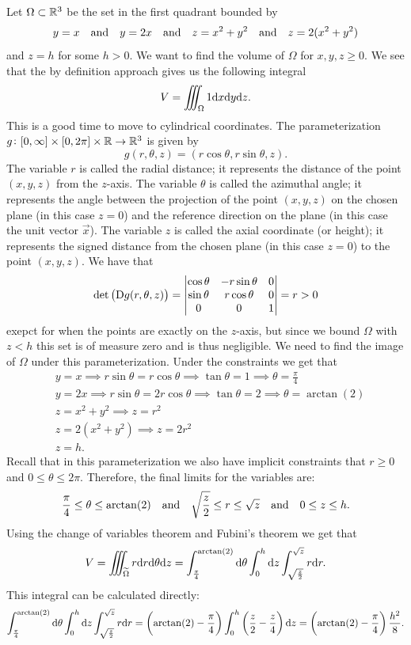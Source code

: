 \documentclass[11pt,a4paper]{article}
\begin{document}
\begin{example}
  Let $\Omega \subset \mathbb{R}^3$ be the set in the first quadrant bounded by
  \[
    y = x \quad \text{and} \quad
    y = 2x \quad \text{and} \quad
    z = x^2 + y^2 \quad \text{and} \quad
    z = 2 (x^2 + y^2)
  \]
  and $z = h$ for some $h > 0$.
  We want to find the volume of $\Omega$ for $x,y,z \geq 0$.
  We see that the by definition approach gives us the following integral
  \[
    V = \iiint_{\Omega} 1 \dx \dy \dz.
  \]
  This is a good time to move to cylindrical coordinates.
  The parameterization $g \colon [0,\infty] \times [0,2\pi] \times \mathbb{R} \to \mathbb{R}^3$
  is given by
  \[
    g(r,\theta,z) = (r \cos \theta, r \sin \theta, z).
  \]
  The variable $r$ is called the radial distance; it represents
  the distance of the point $(x,y,z)$ from the $z$-axis.
  The variable $\theta$ is called the azimuthal angle; it represents
  the angle between the projection of the point $(x,y,z)$ on the chosen
  plane (in this case $z = 0$) and the reference direction on the plane
  (in this case the unit vector $\vec x$).
  The variable $z$ is called the axial coordinate (or height); it represents
  the signed distance from the chosen plane (in this case $z = 0$)
  to the point $(x,y,z)$.
  We have that
  \[
    \det\del{\Dif g(r,\theta,z)} =
    \begin{vmatrix}
      \cos \theta & -r \sin \theta & 0 \\
      \sin \theta & r \cos \theta & 0 \\
      0 & 0 & 1
    \end{vmatrix} = r > 0
  \]
  exepct for when the points are exactly on the $z$-axis,
  but since we bound $\Omega$ with $z < h$ this set is of measure zero
  and is thus negligible.
  We need to find the image of $\Omega$ under this parameterization.
  Under the constraints we get that
  \begin{align*}
    &y = x \implies r \sin \theta = r \cos \theta \implies \tan \theta = 1
    \implies \theta = \frac{\pi}{4} \\
    &y = 2x \implies r \sin \theta = 2r \cos \theta \implies \tan \theta = 2
    \implies \theta = \arctan(2) \\
    &z = x^2 + y^2 \implies z = r^2 \\
    &z = 2 (x^2 + y^2) \implies z = 2r^2 \\
    &z = h.
  \end{align*}
  Recall that in this parameterization we also have implicit constraints
  that $r \geq 0$ and $0 \le \theta \le 2 \pi$.
  Therefore, the final limits for the variables are:
  \[
    \frac{\pi}{4} \le \theta \le \arctan(2) \quad \text{and} \quad
    \sqrt{\frac{z}{2}} \le r \le \sqrt{z} \quad \text{and} \quad
    0 \le z \le h.
  \]
  Using the change of variables theorem and Fubini's theorem we get that
  \[
    V = \iiint_{\widetilde \Omega} r \mathrm{d} r \mathrm{d} \theta \mathrm{d} z =
    \int_{\frac{\pi}{4}}^{\arctan(2)} \mathrm{d} \theta
    \int_{0}^{h} \mathrm{d} z
    \int_{\sqrt{\frac{z}{2}}}^{\sqrt{z}} r \mathrm{d} r.
  \]
  This integral can be calculated directly:
  \[
    \int_{\frac{\pi}{4}}^{\arctan(2)} \dtheta
    \int_{0}^{h} \dz
    \int_{\sqrt{\frac{z}{2}}}^{\sqrt{z}} r \dr =
    \del{\arctan(2) - \frac{\pi}{4}}
    \int_{0}^{h} \del{\frac{z}{2} - \frac{z}{4}}\dz =
    \del{\arctan(2) - \frac{\pi}{4}} \frac{h^2}{8}.
  \]
\end{example}
\end{document}

